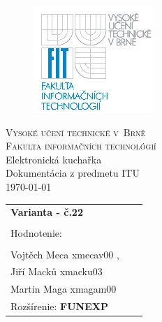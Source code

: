 \begin{titlepage}

\begin{figure}[h]
\begin{center}
\includegraphics[scale=0.6]{logo.jpg}
\end{center}
\end{figure}

\begin{center}
\LARGE
\textsc{Vysoké učení
  technické v~Brně\\ \Large{Fakulta informačních technológií}}\\
\LARGE
Elektronická kuchařka \\
\Huge
Dokumentácia z predmetu ITU\\ 
\large{\medskip
\today }\\
\end{center}
 \hfill   

\begin{flushleft}
\begin{large}
\begin{tabular}{ll}
\textbf{Varianta - č.22} \\ \\
Hodnotenie: \\

 \\Vojtěch Meca   xmecav00 , \ \\ Jiří Macků  xmacku03 \\ Martin Maga xmagam00\\
Rozšírenie:
\textbf{FUNEXP} \\

\end{tabular}
\end{large}
\end{flushleft}
\end{titlepage}
